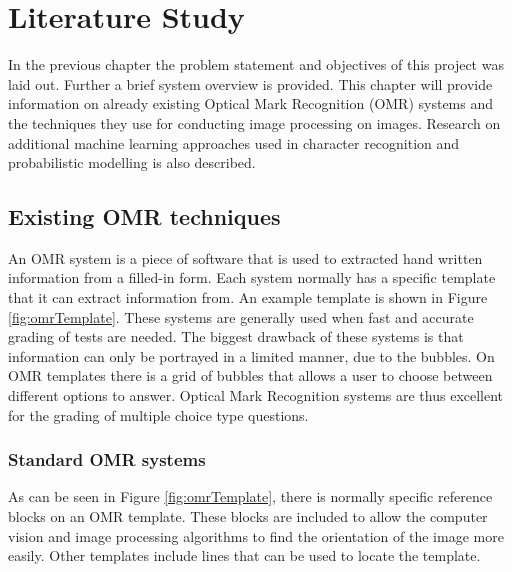 \chapter{Literature Study}
\label{ch:LiteratureStudy}
\graphicspath{{Chapter2/Chapter2Figures/}}

In the previous chapter the problem statement and objectives of this project was laid out. Further a brief system overview is provided.
This chapter will provide information on already existing Optical Mark Recognition (OMR) systems and the techniques they use for conducting image processing on images. Research on additional machine learning approaches used in character recognition and probabilistic modelling is also described.

\section{Existing OMR techniques}
An OMR system is a piece of software that is used to extracted hand written information from a filled-in form. Each system normally has a specific template that it can extract information from. An example template is shown in Figure \ref{fig:omrTemplate}. These systems are generally used when fast and accurate grading of tests are needed. The biggest drawback of these systems is that information can only be portrayed in a limited manner, due to the bubbles. On OMR templates there is a grid of bubbles that allows a user to choose between different options to answer. Optical Mark Recognition systems are thus excellent for the grading of multiple choice type questions. 

\subsection{Standard OMR systems}
\label{sec:StandardTech}

As can be seen in Figure \ref{fig:omrTemplate}, there is normally specific reference blocks on an OMR template. These blocks are included to allow the computer vision and image processing algorithms to find the orientation of the image more easily. Other templates include lines that can be used to locate the template.

